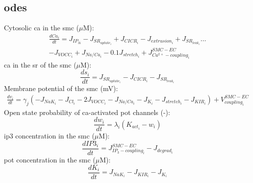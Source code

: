 \documentclass[11pt]{elsarticle}
\newcommand{\uM}{$\mu$M\xspace}
\newcommand{\pot}{\gls{pot}\xspace}
\newcommand{\ca}{\gls{ca}\xspace}
\newcommand{\ip}{\gls{ip3}\xspace}
\begin{document}
\subsection{\Glspl{ode}}
%
Cytosolic \ca in the \gls{smc} (\uM):
\begin{equation}\label{eq:ci}
\begin{split}
\frac{dCa_i}{dt} = J_{IP_{3i}} - J_{SR_{uptake_{i}}} + J_{CICR_{i}} - J_{extrusion_{i}} +  J_{SR_{leak_{i}}}\dots \\
 - J_{VOCC_{i}} + J_{Na/Ca_{i}}  - 0.1J_{stretch_{i}} + J_{Ca^{2+}-coupling_{i}}^{SMC-EC}
\end{split} 
\end{equation}
%
\ca in the \gls{sr} of the \gls{smc} (\uM):
\begin{equation} \label{eq:si}
\frac{ds_i}{dt} =  J_{SR_{uptake_{i}}} - J_{CICR_{i}} - J_{SR_{leak_{i}}}
\end{equation}
%
Membrane potential of the \gls{smc} (mV):
\begin{equation} \label{eq:vi}
\begin{split}
\frac{dv_{i}}{dt} = \gamma_j( -J_{NaK_{i}} - J_{Cl_{i}} - 2J_{VOCC_{i}}- J_{Na/Ca_{i}} - J_{K_{i}}
- J_{stretch_{i}} - J_{KIR_{i}} ) +V^{SMC-EC}_{coupling_{i}}
\end{split}
\end{equation}
%
Open state probability of \ca-activated \pot channels (-):
\begin{equation} \label{eq:dwidt}
\frac{dw_{i}}{dt} =  \lambda_{i} \left( K_{act_{i}} - w_{i} \right)
\end{equation}
%
\ip concentration in the \gls{smc} (\uM):
\begin{equation} \label{eq:dIidt}
\frac{dIP3_i}{dt} = J^{SMC-EC}_{IP_{3}-coupling_{i}} - J_{degrad_{i}}
\end{equation}
%
\pot concentration in the \gls{smc} (\uM):
\begin{equation} \label{eq:dkidt}
\frac{d K_i}{dt}  = J_{NaK_{i}}  - J_{KIR_{i}} - J_{K_{i}}
\end{equation}
%
\end{document}
